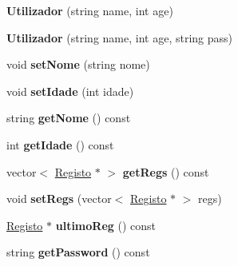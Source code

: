 \begin{DoxyCompactItemize}
\item 
\hypertarget{class_utilizador_a4ce0d50c55e4f03e61ffa97376a2f30c}{{\bfseries Utilizador} (string name, int age)}\label{class_utilizador_a4ce0d50c55e4f03e61ffa97376a2f30c}

\item 
\hypertarget{class_utilizador_a8764eb80a3f0f8c352628272f62dbd6d}{{\bfseries Utilizador} (string name, int age, string pass)}\label{class_utilizador_a8764eb80a3f0f8c352628272f62dbd6d}

\item 
\hypertarget{class_utilizador_a24f10fc3cfa2deb7aa38cc280722327a}{void {\bfseries set\+Nome} (string nome)}\label{class_utilizador_a24f10fc3cfa2deb7aa38cc280722327a}

\item 
\hypertarget{class_utilizador_a1201b047034f08dd8b1e8d4df36ca97b}{void {\bfseries set\+Idade} (int idade)}\label{class_utilizador_a1201b047034f08dd8b1e8d4df36ca97b}

\item 
\hypertarget{class_utilizador_aa5af9c1385b0a93116dd8a80264b887a}{string {\bfseries get\+Nome} () const }\label{class_utilizador_aa5af9c1385b0a93116dd8a80264b887a}

\item 
\hypertarget{class_utilizador_a9abaeb6fbff49683f57164a57e6f0c90}{int {\bfseries get\+Idade} () const }\label{class_utilizador_a9abaeb6fbff49683f57164a57e6f0c90}

\item 
\hypertarget{class_utilizador_a41730715f6cdd5bd98e3647150836989}{vector$<$ \hyperlink{class_registo}{Registo} $\ast$ $>$ {\bfseries get\+Regs} () const }\label{class_utilizador_a41730715f6cdd5bd98e3647150836989}

\item 
\hypertarget{class_utilizador_a6a319b5af1400354e5fc22056fbfefc5}{void {\bfseries set\+Regs} (vector$<$ \hyperlink{class_registo}{Registo} $\ast$ $>$ regs)}\label{class_utilizador_a6a319b5af1400354e5fc22056fbfefc5}

\item 
\hypertarget{class_utilizador_aadf5270d1131da77040b628c23ef89b2}{\hyperlink{class_registo}{Registo} $\ast$ {\bfseries ultimo\+Reg} () const }\label{class_utilizador_aadf5270d1131da77040b628c23ef89b2}

\item 
\hypertarget{class_utilizador_a8be0d01c3f23383c25596bd1c73918e4}{string {\bfseries get\+Password} () const }\label{class_utilizador_a8be0d01c3f23383c25596bd1c73918e4}


\end{DoxyCompactItemize}
